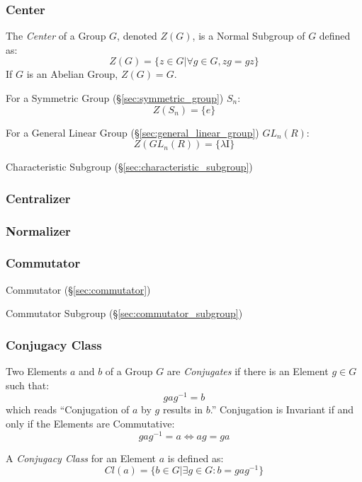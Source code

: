 \subsubsection{Center}\label{sec:group_center}

The \emph{Center} of a Group $G$, denoted $Z(G)$, is a Normal Subgroup
of $G$ defined as:
\[
    Z(G) = \{ z \in G | \forall g \in G, zg = gz \}
\]
If $G$ is an Abelian Group, $Z(G) = G$.

For a Symmetric Group (\S\ref{sec:symmetric_group}) $S_n$:
\[
    Z(S_n) = \{e\}
\]

For a General Linear Group (\S\ref{sec:general_linear_group})
$GL_n(R)$:
\[
    Z(GL_n(R)) = \{\lambda \mathrm{I}\}
\]

Characteristic Subgroup (\S\ref{sec:characteristic_subgroup})



\subsubsection{Centralizer}\label{sec:group_centralizer}

\subsubsection{Normalizer}\label{sec:group_normalizer}

\subsubsection{Commutator}\label{sec:group_commutator}

Commutator (\S\ref{sec:commutator})

Commutator Subgroup (\S\ref{sec:commutator_subgroup})



\subsubsection{Conjugacy Class}\label{sec:conjugacy_class}

Two Elements $a$ and $b$ of a Group $G$ are \emph{Conjugates} if there
is an Element $g \in G$ such that:
\[
    gag^{-1} = b
\]
which reads ``Conjugation of $a$ by $g$ results in $b$.'' Conjugation
is Invariant if and only if the Elements are Commutative:
\[
    gag^{-1} = a \Leftrightarrow ag = ga
\]

A \emph{Conjugacy Class} for an Element $a$ is defined as:
\[
    Cl(a) = \{ b \in G | \exists g \in G : b = gag^{-1}\}
\]



